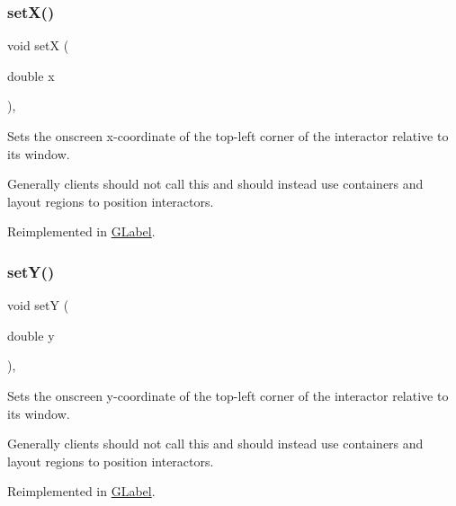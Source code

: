 \subsubsection{\texorpdfstring{set\+X()}{setX()}}
{\footnotesize\ttfamily void setX (\begin{DoxyParamCaption}\item[{double}]{x }\end{DoxyParamCaption})\hspace{0.3cm}{\ttfamily [virtual]}, {\ttfamily [inherited]}}



Sets the onscreen x-\/coordinate of the top-\/left corner of the interactor relative to its window. 

Generally clients should not call this and should instead use containers and layout regions to position interactors. 

Reimplemented in \mbox{\hyperlink{classsgl_1_1GLabel_a173837ba805eaa2411e88834869d3a9c}{G\+Label}}.

\mbox{\label{classsgl_1_1GInteractor_a7d57e2a5c35d27feb58fd498a3cf82b9}} 
\subsubsection{\texorpdfstring{set\+Y()}{setY()}}
{\footnotesize\ttfamily void setY (\begin{DoxyParamCaption}\item[{double}]{y }\end{DoxyParamCaption})\hspace{0.3cm}{\ttfamily [virtual]}, {\ttfamily [inherited]}}



Sets the onscreen y-\/coordinate of the top-\/left corner of the interactor relative to its window. 

Generally clients should not call this and should instead use containers and layout regions to position interactors. 

Reimplemented in \mbox{\hyperlink{classsgl_1_1GLabel_a0b738606c7aca5c472b66c4e55b3c685}{G\+Label}}.

\mbox{\label{classsgl_1_1GObservable_a1fe5121d6528fdea3f243321b3fa3a49}} 
